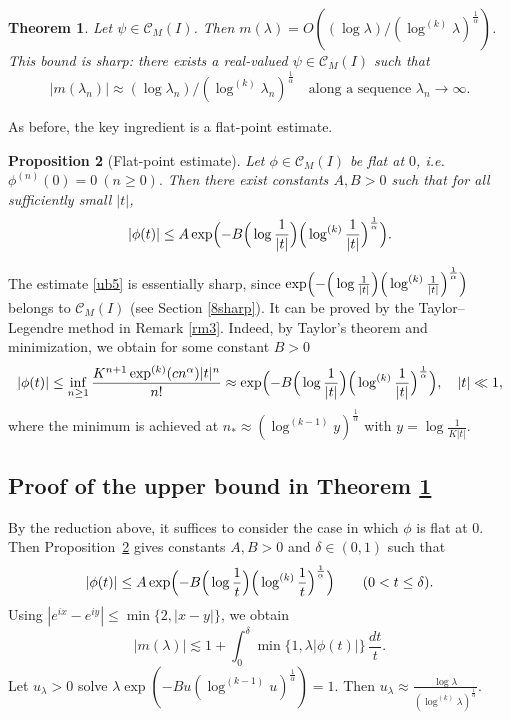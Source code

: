 \documentclass[11pt]{amsart}
\newtheorem{theorem}{Theorem}[section]
\newtheorem{proposition}[theorem]{Proposition}
\newcommand{\la}{\lambda}
\newcommand{\ls}{\lesssim}
\newcommand{\1}{{\rm 1\hspace*{-0.4ex}%
			\rule{0.1ex}{1.52ex}\hspace*{0.2ex}}}
\numberwithin{equation}{section}
\begin{document}
\begin{theorem}\label{thm:main5}
	Let  $\psi\in \mathcal{C}_M(I)$. Then $m(\la)=O((\log\la)/(\log^{(k)}\la)^{\frac1\alpha})$. This bound is sharp: there exists a real-valued $\psi\in \mathcal{C}_M(I)$ such that
	\[
	|m(\lambda_n)| \approx (\log\la_n)/(\log^{(k)}\la_n)^{\frac1\alpha}
	\quad\text{along a sequence }\lambda_n\to\infty.
	\]

\end{theorem}
As before, the key ingredient is a flat-point estimate.
\begin{proposition}[Flat-point estimate]\label{prop5}
	Let $\phi\in \mathcal{C}_M(I)$ be flat at $0$, i.e. $\phi^{(n)}(0)=0\ (n\ge 0).$
	Then there exist constants $A,B>0$ such that for all sufficiently small $|t|$,
\begin{equation}\label{ub5}
	|\phi(t)|\le A\exp\Bigl(-B \Big(\log\frac1{|t|}\Big)\Big(\log^{(k)}\frac1{|t|}\Big)^{\frac1\alpha}\Bigr).
\end{equation}
\end{proposition}
The estimate \eqref{ub5} is essentially sharp, since $\exp\Bigl(- \Big(\log\frac1{|t|}\Big)\Big(\log^{(k)}\frac1{|t|}\Big)^{\frac1\alpha}\Bigr)$ belongs to $\mathcal{C}_M(I)$ (see Section \ref{8sharp}). It can be proved by the Taylor--Legendre method in Remark \ref{rm3}. Indeed, by Taylor's theorem and minimization, we obtain for some constant $B>0$
\[|\phi(t)|\le \inf_{n\ge1}\frac{K^{n+1}\exp^{(k)}(cn^\alpha)|t|^n}{n!}\approx \exp\Bigl(-B \Big(\log\frac1{|t|}\Big)\Big(\log^{(k)}\frac1{|t|}\Big)^{\frac1\alpha}\Bigr),\quad |t|\ll1,\]
where the minimum is achieved at $n_*\approx (\log^{(k-1)} y) ^{\frac1\alpha}$ with $y=\log\frac1{K|t|}$. 


\subsection{Proof of the upper bound in Theorem \ref{thm:main5}}
By the reduction above, it suffices to consider the case in which \(\phi\) is flat at \(0\). Then Proposition~\ref{prop5} gives constants \(A,B>0\) and \(\delta\in(0,1)\) such that
\begin{equation}
	|\phi(t)|\le A\exp\Bigl(-B \Big(\log\frac1{t}\Big)\Big(\log^{(k)}\frac1{t}\Big)^{\frac1\alpha}\Big)
	\qquad (0<t\le \delta).
\end{equation}
Using \(|e^{ix}-e^{iy}|\le \min\{2,|x-y|\}\), we obtain
\[
|m(\lambda)|
\ls 1+\int_0^\delta \min\{1,\lambda|\phi(t)|\}\,\frac{dt}{t}.
\]
Let $u_\la>0$ solve $\la\exp(-Bu(\log^{(k-1)}u)^{\frac1\alpha})=1$. Then $u_\la\approx \frac{\log\la}{(\log^{(k)}\la)^{\frac1\alpha}}$. 
\end{document}
